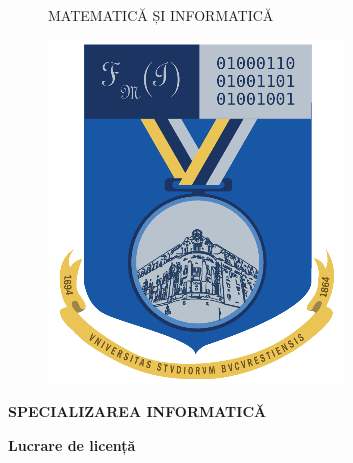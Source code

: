 \documentclass[11pt, a4paper]{report}
\begin{document}
\begin{titlepage}
\begin{figure}[!htb]
\begin{minipage}{0.5\textwidth}
\begin{center}
{                  MATEMATICĂ ȘI INFORMATICĂ
              }
          \end{center}
      \end{minipage}
      \begin{minipage}{0.2\textwidth}
          \includegraphics[width=\linewidth]{logo-fmi.png}
      \end{minipage}
  \end{figure}
  
  \begin{center}
  \textbf{SPECIALIZAREA INFORMATICĂ}
  \end{center}
  
  \vspace{1cm}
  
  \begin{center}
  \Large \textbf{Lucrare de licență}
  \end{center}
  
  \begin{center}
  \huge \textbf{\MakeUppercase{\@title}}
  \end{center}
  
  \vspace{3cm}
  

\end{titlepage}
\end{document}
